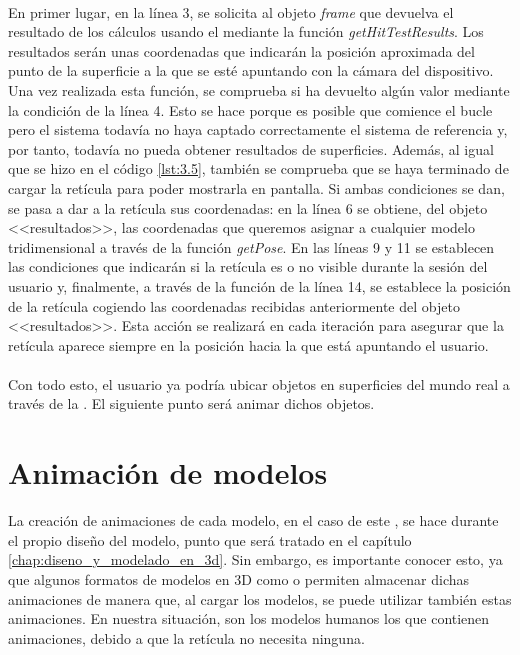 \documentclass{subfiles}
\begin{document}
        \paragraph{}
        En primer lugar, en la línea 3, se solicita al objeto \textit{frame} que devuelva el resultado de los cálculos usando el \hittestsource mediante la función \textit{getHitTestResults}. Los resultados serán unas coordenadas que indicarán la posición aproximada del punto de la superficie a la que se esté apuntando con la cámara del dispositivo. Una vez realizada esta función, se comprueba si ha devuelto algún valor mediante la condición de la línea 4. Esto se hace porque es posible que comience el bucle pero el sistema todavía no haya captado correctamente el sistema de referencia y, por tanto, todavía no pueda obtener resultados de superficies. Además, al igual que se hizo en el código \ref{lst:3.5}, también se comprueba que se haya terminado de cargar la retícula para poder mostrarla en pantalla. Si ambas condiciones se dan, se pasa a dar a la retícula sus coordenadas: en la línea 6 se obtiene, del objeto <<resultados>>, las coordenadas que queremos asignar a cualquier modelo tridimensional a través de la función \textit{getPose}. En las líneas 9 y 11 se establecen las condiciones que indicarán si la retícula es o no visible durante la sesión del usuario y, finalmente, a través de la función de la línea 14, se establece la posición de la retícula cogiendo las coordenadas recibidas anteriormente del objeto <<resultados>>. Esta acción se realizará en cada iteración para asegurar que la retícula aparece siempre en la posición hacia la que está apuntando el usuario.

        \paragraph{}
        Con todo esto, el usuario ya podría ubicar objetos en superficies del mundo real a través de la \ra. El siguiente punto será animar dichos objetos.

        
        \section{Animación de modelos}
        \label{sec:animacion_de_modelos}
        La creación de animaciones de cada modelo, en el caso de este \tfg, se hace durante el propio diseño del modelo, punto que será tratado en el capítulo \ref{chap:diseno_y_modelado_en_3d}. Sin embargo, es importante conocer esto, ya que algunos formatos de modelos en 3D como \glb o \gltf permiten almacenar dichas animaciones de manera que, al cargar los modelos, se puede utilizar también estas animaciones. En nuestra situación, son los modelos humanos los que contienen animaciones, debido a que la retícula no necesita ninguna.
\end{document}
